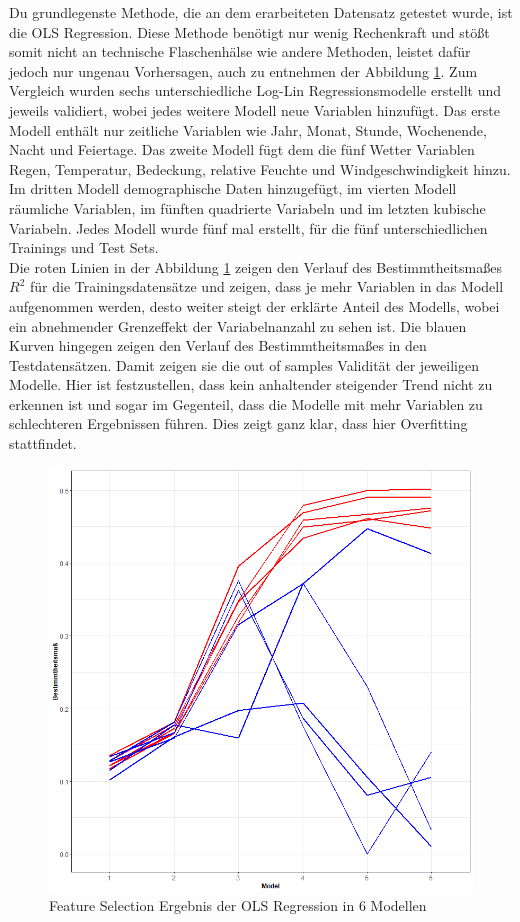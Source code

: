 \documentclass[a4paper,12pt]{thesis}
\begin{document}
Du grundlegenste Methode, die an dem erarbeiteten Datensatz getestet wurde, ist die OLS Regression. Diese Methode benötigt nur wenig Rechenkraft und stößt somit nicht an technische Flaschenhälse wie andere Methoden, leistet dafür jedoch nur ungenau Vorhersagen, auch zu entnehmen der Abbildung \ref{OLS_ModelSelection}. Zum Vergleich wurden sechs unterschiedliche Log-Lin Regressionsmodelle erstellt und jeweils validiert, wobei jedes weitere Modell neue Variablen hinzufügt. Das erste Modell enthält nur zeitliche Variablen wie Jahr, Monat, Stunde, Wochenende, Nacht und Feiertage. Das zweite Modell fügt dem die fünf Wetter Variablen Regen, Temperatur, Bedeckung, relative Feuchte und Windgeschwindigkeit hinzu. Im dritten Modell demographische Daten hinzugefügt, im vierten Modell räumliche Variablen, im fünften quadrierte Variabeln und im letzten kubische Variabeln. Jedes Modell wurde fünf mal erstellt, für die fünf unterschiedlichen Trainings und Test Sets.\\
Die roten Linien in der Abbildung \ref{OLS_ModelSelection} zeigen den Verlauf des Bestimmtheitsmaßes $R^2$ für die Trainingsdatensätze und zeigen, dass je mehr Variablen in das Modell aufgenommen werden, desto weiter steigt der erklärte Anteil des Modells, wobei ein abnehmender Grenzeffekt der Variabelnanzahl zu sehen ist. Die blauen Kurven hingegen zeigen den Verlauf des Bestimmtheitsmaßes in den Testdatensätzen. Damit zeigen sie die out of samples Validität der jeweiligen Modelle. Hier ist festzustellen, dass kein anhaltender steigender Trend nicht zu erkennen ist und sogar im Gegenteil, dass die Modelle mit mehr Variablen zu schlechteren Ergebnissen führen. Dies zeigt ganz klar, dass hier Overfitting stattfindet.\\

\begin{figure}[!ht]
	\centering
	\includegraphics[width=\textwidth]{Plots/plot30.png}
	\caption{Feature Selection  Ergebnis der OLS Regression in 6 Modellen}
	\label{OLS_ModelSelection}
\end{figure}
\end{document}
